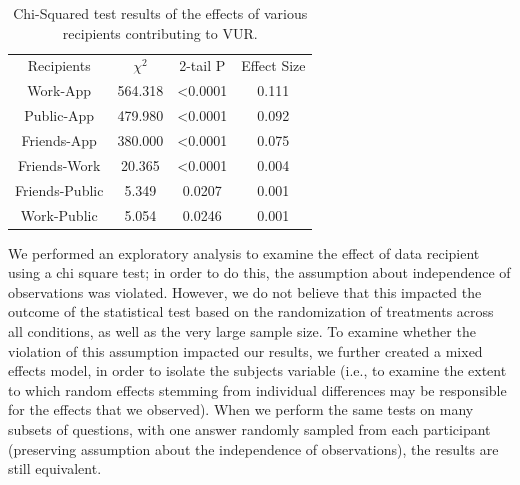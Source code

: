 \documentclass{acm_proc_article-sp}
\begin{document}
\begin{table}[t]
\begin{center}
\begin{tabular}{| c | c | c | c |}
Recipients	& $\chi^2$ &	2-tail P &  Effect Size \\
Work-App	& 564.318 & <0.0001 & 0.111\\
Public-App	& 479.980 & <0.0001 &  0.092\\
Friends-App & 380.000 & <0.0001 & 0.075\\
Friends-Work & 20.365 & <0.0001 &  0.004\\
Friends-Public & 5.349 & 0.0207 &  0.001\\
Work-Public&  5.054 & 0.0246 &  0.001\\
\end{tabular}
\caption{Chi-Squared test results of the effects of various recipients contributing to VUR.}
\label{recipient}
\end{center}
\end{table}				
						

We performed an exploratory analysis to examine the effect of data recipient using a chi square test; in order to do this, the assumption about independence of observations was violated. However, we do not believe that this impacted the outcome of the statistical test based on the randomization of treatments across all conditions, as well as the very large sample size. To examine whether the violation of this assumption impacted our results, we further created a mixed effects model, in order to isolate the subjects variable (i.e., to examine the extent to which random effects stemming from individual differences may be responsible for the effects that we observed). When we perform the same tests on many subsets of questions, with one answer randomly sampled from each participant (preserving assumption about the independence of observations), the results are still equivalent. 
\end{document}
